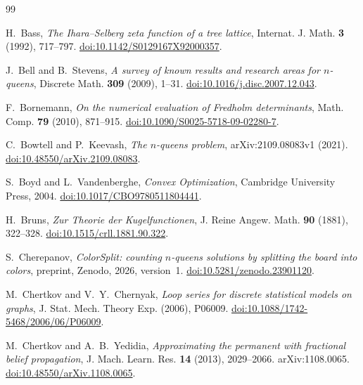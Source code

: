 \renewcommand*{\refname}{\phantomsection References}
\begin{thebibliography}{99}
\raggedright

 H.~Bass, \emph{The Ihara--Selberg zeta function of a tree lattice}, Internat. J.
Math. \textbf{3} (1992), 717--797.
\href{https://doi.org/10.1142/S0129167X92000357}{doi:10.1142/S0129167X92000357}.

 J.~Bell and B.~Stevens, \emph{A survey of known results and research areas
for $n$-queens}, Discrete Math. \textbf{309} (2009), 1--31.
\href{https://doi.org/10.1016/j.disc.2007.12.043}{doi:10.1016/j.disc.2007.12.043}.

 F.~Bornemann, \emph{On the numerical evaluation of Fredholm determinants}, Math.
Comp. \textbf{79} (2010), 871--915.
\href{https://doi.org/10.1090/S0025-5718-09-02280-7}{doi:10.1090/S0025-5718-09-02280-7}.

 C.~Bowtell and P.~Keevash, \emph{The $n$-queens problem}, arXiv:2109.08083v1 (2021).
\href{https://doi.org/10.48550/arXiv.2109.08083}{doi:10.48550/arXiv.2109.08083}.

 S.~Boyd and L.~Vandenberghe, \emph{Convex Optimization}, Cambridge University Press, 2004.
\href{https://doi.org/10.1017/CBO9780511804441}{doi:10.1017/CBO9780511804441}.

 H.~Bruns, \emph{Zur Theorie der Kugelfunctionen}, J. Reine Angew. Math. \textbf{90}
(1881), 322--328.
\href{https://doi.org/10.1515/crll.1881.90.322}{doi:10.1515/crll.1881.90.322}.

 S.~Cherepanov, \emph{ColorSplit: counting $n$-queens solutions by splitting the
board into colors}, preprint, Zenodo, 2026, version~1.
\href{https://doi.org/10.5281/zenodo.23901120}{doi:10.5281/zenodo.23901120}.

 M.~Chertkov and V.~Y.~Chernyak, \emph{Loop series for discrete statistical models on
graphs}, J. Stat. Mech. Theory Exp. (2006), P06009.
\href{https://doi.org/10.1088/1742-5468/2006/06/P06009}{doi:10.1088/1742-5468/2006/06/P06009}.

 M.~Chertkov and A.~B.~Yedidia, \emph{Approximating the permanent with
fractional belief propagation}, J. Mach. Learn. Res. \textbf{14} (2013), 2029--2066.
arXiv:1108.0065. \href{https://doi.org/10.48550/arXiv.1108.0065}{doi:10.48550/arXiv.1108.0065}.


\end{thebibliography}
